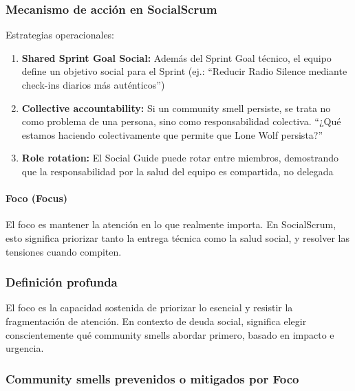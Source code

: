 \subsubsection*{Mecanismo de acción en SocialScrum}

Estrategias operacionales:
\begin{enumerate}
\item \textbf{Shared Sprint Goal Social:} Además del Sprint Goal técnico, el equipo define un objetivo social para el Sprint (ej.: ``Reducir Radio Silence mediante check-ins diarios más auténticos'')
\item \textbf{Collective accountability:} Si un community smell persiste, se trata no como problema de una persona, sino como responsabilidad colectiva. ``¿Qué estamos haciendo colectivamente que permite que Lone Wolf persista?''
\item \textbf{Role rotation:} El Social Guide puede rotar entre miembros, demostrando que la responsabilidad por la salud del equipo es compartida, no delegada
\end{enumerate}

\paragraph{Foco (Focus)}

El foco es mantener la atención en lo que realmente importa. En SocialScrum, esto significa priorizar tanto la entrega técnica como la salud social, y resolver las tensiones cuando compiten.

\subsubsection*{Definición profunda}

El foco es la capacidad sostenida de priorizar lo esencial y resistir la fragmentación de atención. En contexto de deuda social, significa elegir conscientemente qué community smells abordar primero, basado en impacto e urgencia.

\subsubsection*{Community smells prevenidos o mitigados por Foco}

